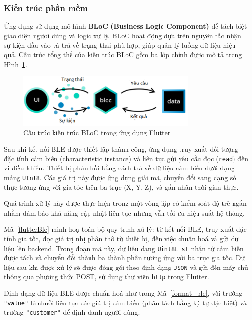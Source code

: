\subsubsection*{Kiến trúc phần mềm}
Ứng dụng sử dụng mô hình \textbf{BLoC (Business Logic Component)} để tách biệt giao diện 
người dùng và logic xử lý. BLoC hoạt động dựa trên nguyên tắc nhận sự 
kiện đầu vào và trả về trạng thái phù hợp, giúp quản lý luồng dữ liệu 
hiệu quả. Cấu trúc tổng thể của kiến trúc BLoC gồm ba lớp chính được mô 
tả trong Hình~\ref{flutter}.

\begin{figure}[htbp]
    \centering
    \includegraphics[width=0.8\textwidth]{images/flutter.png}
    \caption{Cấu trúc kiến trúc BLoC trong ứng dụng Flutter}
    \label{flutter}
\end{figure}





Sau khi kết nối BLE được thiết lập thành công, ứng dụng truy xuất đối tượng đặc 
tính cảm biến (characteristic instance) và liên tục gửi yêu cầu đọc (\texttt{read}) 
đến vi điều khiển. Thiết bị phản hồi bằng cách trả về dữ liệu cảm biến 
dưới dạng mảng \texttt{UInt8}. Các giá trị này được ứng dụng giải mã, 
chuyển đổi sang dạng số thực tương ứng với gia tốc trên ba trục (X, Y, Z), 
và gắn nhãn thời gian thực.

Quá trình xử lý này được thực hiện trong một vòng 
lặp có kiểm soát độ trễ ngắn nhằm đảm bảo khả năng cập nhật liên tục 
nhưng vẫn tối ưu hiệu suất hệ thống.

Mã~\ref{flutterBle} minh hoạ toàn bộ quy trình xử lý: 
từ kết nối BLE, truy xuất đặc tính gia tốc, đọc giá trị nhị phân 
thô từ thiết bị, đến việc chuẩn hoá và gửi dữ liệu lên backend. 
Trong đoạn mã này, dữ liệu dạng \texttt{Uint8List} nhận từ cảm biến được tách và chuyển đổi 
thành ba thành phần tương ứng với ba trục gia tốc. Dữ liệu sau khi được xử lý sẽ được 
đóng gói theo định dạng \texttt{JSON} và gửi đến máy chủ thông qua phương thức 
POST, sử dụng thư viện \texttt{http} trong Flutter.

Định dạng dữ liệu BLE được chuẩn hoá như trong Mã~\ref{format_ble}, 
với trường \texttt{"value"} là chuỗi liên tục các 
giá trị cảm biến (phân tách bằng ký tự đặc biệt) và trường 
\texttt{"customer"} để định danh người dùng.

